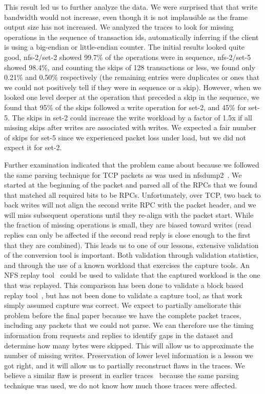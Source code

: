 This result led us to further analyze the data.  We were surprised
that that write bandwidth would not increase, even though it is not
implausible as the frame output size has not increased.  We analyzed
the traces to look for missing operations in the sequence of
transaction ids, automatically inferring if the client is using a
big-endian or little-endian counter.  The initial results looked quite
good, nfs-2/set-2 showed 99.7\% of the operations were in sequence,
nfs-2/set-5 showed 98.4\%, and counting the skips of 128 transactions
or less, we found only 0.21\% and 0.50\% respectively (the remaining
entries were duplicates or ones that we could not positively tell if
they were in sequence or a skip).  However, when we looked one level
deeper at the operation that preceded a skip in the sequence, we found
that 95\% of the skips followed a write operation for set-2, and 45\%
for set-5.  The skips in set-2 could increase the write workload by a
factor of 1.5x if all missing skips after writes are associated with
writes.  We expected a fair number of skips for set-5 since we
experienced packet loss under load, but we did not expect it for
set-2.

Further examination indicated that the problem came about because we
followed the same parsing technique for TCP packets as was used in
nfsdump2~\cite{ellardTraces}.  We started at the beginning of the
packet and parsed all of the RPCs that we found that matched all
required bits to be RPCs.  Unfortunately, over TCP, two back to back
writes will not align the second write RPC with the packet header, and
we will miss subsequent operations until they re-align with the packet
start.  While the fraction of missing operations is small, they are
biased toward writes (read replies can only be affected if the second
read reply is close enough to the first that they are combined).  This
leads us to one of our lessons, extensive validation of the conversion
tool is important.  Both validation through validation statistics, and
through the use of a known workload that exercises the capture tools.
An NFS replay tool~\cite{NingningFast05} could be used to validate
that the captured workload is the one that was replayed.  This
comparison has been done to validate a block based replay
tool~\cite{AndersonFast04}, but has not been done to validate a
capture tool, as that work simply assumed capture was correct.  We
expect to partially ameliorate this problem before the final paper
because we have the complete packet traces, including any packets that
we could not parse.  We can therefore use the timing information from
requests and replies to identify gaps in the dataset and determine how
many bytes were skipped.  This will allow us to approximate the number
of missing writes.  Preservation of lower level information is a
lesson we got right, and it will allow us to partially reconstruct
flaws in the traces.  We believe a similar flaw is present in earlier
traces~\cite{ellardTraces} because the same parsing technique was
used, we do not know how much those traces were affected.

